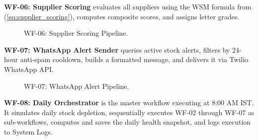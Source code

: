 \documentclass[journal]{IEEEtran}
\begin{document}
\textbf{WF-06: Supplier Scoring} evaluates all suppliers using the WSM formula from (\ref{eq:supplier_scoring}), computes composite scores, and assigns letter grades.

\begin{figure}[H]
\centering
{}
\caption{WF-06: Supplier Scoring Pipeline.}
\label{fig:wf06}
\end{figure}

\textbf{WF-07: WhatsApp Alert Sender} queries active stock alerts, filters by 24-hour anti-spam cooldown, builds a formatted message, and delivers it via Twilio WhatsApp API.

\begin{figure}[H]
\centering
{}
\caption{WF-07: WhatsApp Alert Pipeline.}
\label{fig:wf07}
\end{figure}

\textbf{WF-08: Daily Orchestrator} is the master workflow executing at 8:00 AM IST. It simulates daily stock depletion, sequentially executes WF-02 through WF-07 as sub-workflows, computes and saves the daily health snapshot, and logs execution to System Logs.
\end{document}
